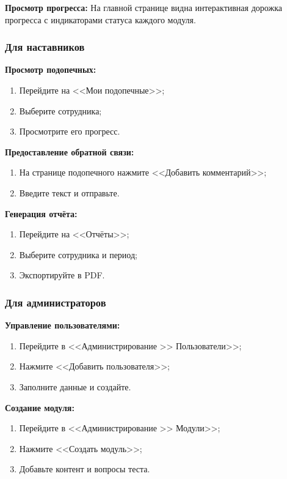 \textbf{Просмотр прогресса:}
На главной странице видна интерактивная дорожка прогресса с индикаторами статуса каждого модуля.

\subsubsection{Для наставников}

\textbf{Просмотр подопечных:}
\begin{enumerate}
    \item Перейдите на <<Мои подопечные>>;
    \item Выберите сотрудника;
    \item Просмотрите его прогресс.
\end{enumerate}

\textbf{Предоставление обратной связи:}
\begin{enumerate}
    \item На странице подопечного нажмите <<Добавить комментарий>>;
    \item Введите текст и отправьте.
\end{enumerate}

\textbf{Генерация отчёта:}
\begin{enumerate}
    \item Перейдите на <<Отчёты>>;
    \item Выберите сотрудника и период;
    \item Экспортируйте в PDF.
\end{enumerate}

\subsubsection{Для администраторов}

\textbf{Управление пользователями:}
\begin{enumerate}
    \item Перейдите в <<Администрирование >> Пользователи>>;
    \item Нажмите <<Добавить пользователя>>;
    \item Заполните данные и создайте.
\end{enumerate}

\textbf{Создание модуля:}
\begin{enumerate}
    \item Перейдите в <<Администрирование >> Модули>>;
    \item Нажмите <<Создать модуль>>;
    \item Добавьте контент и вопросы теста.
\end{enumerate}

